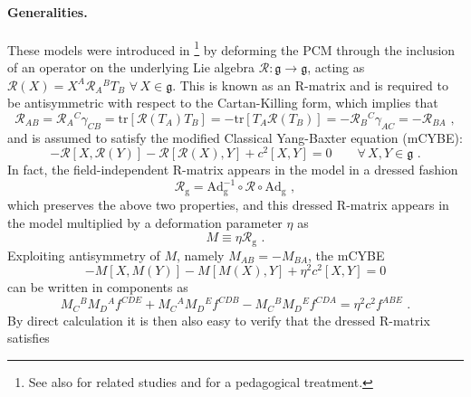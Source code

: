 \documentclass[12pt]{article}
\numberwithin{equation}{section}
\begin{document}
\paragraph{Generalities.}
These models were introduced in \cite{Klimcik:2002zj}\footnote{See also \cite{Klimcik:2008eq,Klimcik:2014bta} for related studies and \cite{Yoshida:2021qfl} for a pedagogical treatment.} by deforming the PCM through the inclusion of an operator on the underlying Lie algebra $\mathcal{R}:\mathfrak{g} \longrightarrow\mathfrak{g}$, acting as $\mathcal{R}(X)=X^{A}\mathcal{R}_{A}{}^{B}T_{B} \,\, \forall\, X\in \mathfrak{g}$. This is known as an R-matrix and is required to be antisymmetric with respect to the Cartan-Killing form, which implies that
\begin{equation}\label{R-matrix-antisymmetry}
\mathcal{R}_{AB}=\mathcal{R}_{A}{}^{C}\gamma_{CB}=\mathrm{tr}[\mathcal{R}(T_{A})T_{B}]=-\mathrm{tr}[T_{A}\mathcal{R}(T_{B})]=-\mathcal{R}_{B}{}^{C}\gamma_{AC}=-\mathcal{R}_{BA} \,\, ,
\end{equation}
and is assumed to satisfy the modified Classical Yang-Baxter equation (mCYBE):
\begin{equation}
[\mathcal{R}(X),\mathcal{R}(Y)]-\mathcal{R}[X,\mathcal{R}(Y)]-\mathcal{R}[\mathcal{R}(X),Y]+c^2[X,Y]=0 \qquad \forall \, X,Y \in \mathfrak{g} \,\, .
\end{equation}
In fact, the field-independent R-matrix appears in the model in a dressed fashion
\begin{equation}
\mathcal{R}_{\mathrm{g}}=\mathrm{Ad}_{\mathrm{g}}^{-1} \circ\mathcal{R}\circ \mathrm{Ad}_{\mathrm{g}} \,\, ,
\end{equation}
which preserves the above two properties, and this dressed R-matrix appears in the model multiplied by a deformation parameter $\eta$ as
\begin{equation}
M\equiv \eta \mathcal{R}_{\mathrm{g}} \,\, .
\end{equation}
Exploiting antisymmetry of $M$, namely $M_{AB}=-M_{BA}$, the mCYBE 
\begin{equation}
[M(X),M(Y)]-M[X,M(Y)]-M[M(X),Y]+\eta^2c^2[X,Y]=0 
\end{equation}
can be written in components as
\begin{equation}\label{mCYBE-components}
M_{C}{}^{B}M_{D}{}^{A}f^{CDE}+M_{C}{}^{A}M_{D}{}^{E}f^{CDB}-M_{C}{}^{B}M_{D}{}^{E}f^{CDA}=\eta^2 c^2 f^{ABE} \,\, .
\end{equation}
By direct calculation it is then also easy to verify that the dressed R-matrix satisfies
\end{document}
